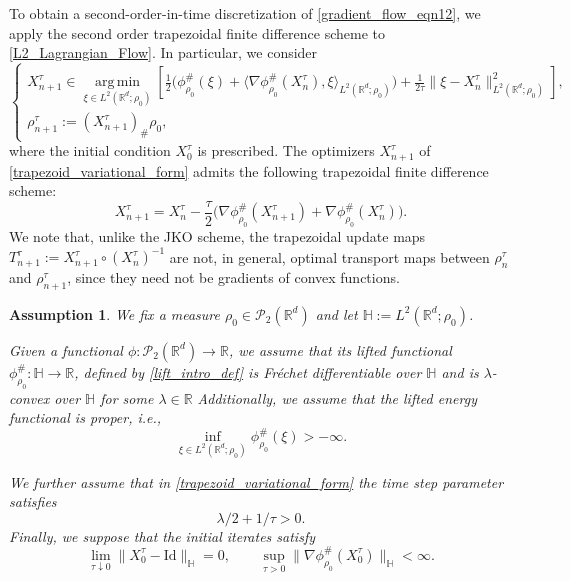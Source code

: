 \documentclass[10pt,a4paper]{amsart}
\newtheorem{assumption}{Assumption}
\begin{document}
To obtain a second-order-in-time discretization of \eqref{gradient_flow_eqn12}, we apply the second order trapezoidal finite difference scheme to \eqref{L2_Lagrangian_Flow}. In particular, we consider
\begin{equation}
\begin{cases}
X^{\tau}_{n+1}
\in \operatorname*{arg\,min}_{\xi \in L^2(\mathbb{R}^d;\rho_0)}
\left[
\frac{1}{2}\bigl(\phi^{\#}_{\rho_0}(\xi)
+ \langle
\nabla \phi^{\#}_{\rho_0}(X^{\tau}_n),
\xi
\rangle_{L^2(\mathbb{R}^d;\rho_0)}
\bigr)
+ \frac{1}{2 \tau}\|\xi - X^{\tau}_n\|_{L^2(\mathbb{R}^d;\rho_0)}^2
\right], \\
\rho^{\tau}_{n+1} := (X^{\tau}_{n+1})_{\#} \rho_0,
\end{cases}
\label{trapezoid_variational_form}
\end{equation}
where the initial condition $X^{\tau}_0$ is prescribed.
 The optimizers $X^{\tau}_{n+1}$ of \eqref{trapezoid_variational_form} admits the following trapezoidal finite difference scheme:
\begin{equation}
X^{\tau}_{n+1}
= X^{\tau}_n
- \frac{\tau}{2} \bigl(
\nabla \phi^{\#}_{\rho_0}(X^{\tau}_{n+1})
+ \nabla \phi^{\#}_{\rho_0}(X^{\tau}_{n})
\bigr). \label{trapezoid_rule123}
\end{equation}
We note that, unlike the JKO scheme, the trapezoidal update maps
$T^{\tau}_{n+1} := X^{\tau}_{n+1} \circ (X^{\tau}_n)^{-1}$
are not, in general, optimal transport maps between
$\rho_{n}^{\tau}$ and $\rho_{n+1}^{\tau}$, since they need not be gradients of convex functions.

\begin{assumption} \label{assume_rough}
    We fix a measure $\rho_0 \in \mathcal{P}_2(\mathbb{R}^d)$ and let $\mathbb{H} := L^2(\mathbb{R}^d;\rho_0)$.  \smallskip 

\noindent Given a functional $\phi : \mathcal{P}_2(\mathbb{R}^d) \to \mathbb{R}$, we assume that its lifted functional $\phi_{\rho_0}^{\#} : \mathbb{H} \to \mathbb{R}$, defined by \eqref{lift_intro_def}
is Fréchet differentiable over $\mathbb{H}$ and is $\lambda$-convex over $\mathbb{H}$ for some $\lambda \in \mathbb{R}$ Additionally, we assume that the lifted energy functional is proper, i.e.,
\[
\inf_{\xi \in L^2(\mathbb{R}^d;\rho_0)} \phi^{\#}_{\rho_0}(\xi) > -\infty.
\] 

\noindent We further assume that in \eqref{trapezoid_variational_form} the time step parameter satisfies
\[
    \lambda/2 + 1/\tau > 0.
\]
Finally, we suppose that the initial iterates satisfy
\[
    \lim_{\tau \downarrow 0} \|X_0^{\tau} - \mathrm{Id}\|_{\mathbb{H}} = 0,
    \qquad
    \sup_{\tau > 0} \|\nabla \phi^{\#}_{\rho_0}(X_0^{\tau})\|_{\mathbb{H}} < \infty.
\]
\end{assumption}
\end{document}
